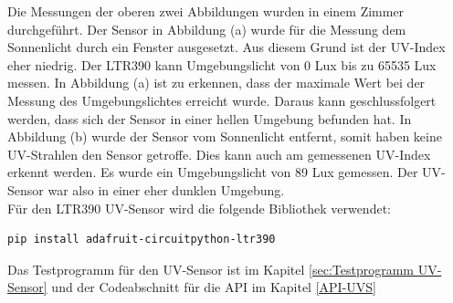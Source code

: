 Die Messungen der oberen zwei Abbildungen wurden in einem Zimmer durchgeführt. Der Sensor in Abbildung (a) wurde für die Messung dem Sonnenlicht durch ein Fenster ausgesetzt. Aus diesem Grund ist der UV-Index eher niedrig. Der LTR390 kann Umgebungslicht von 0 Lux bis zu 65535 Lux messen. In Abbildung (a) ist zu erkennen, dass der maximale Wert bei der Messung des Umgebungslichtes erreicht wurde. Daraus kann geschlussfolgert werden, dass sich der Sensor in einer hellen Umgebung befunden hat. In Abbildung (b) wurde der Sensor vom Sonnenlicht entfernt, somit haben keine UV-Strahlen den Sensor getroffe. Dies kann auch am gemessenen UV-Index erkennt werden. Es wurde ein Umgebungslicht von 89 Lux gemessen. Der UV-Sensor war also in einer eher dunklen Umgebung.\\
Für den LTR390 UV-Sensor wird die folgende Bibliothek\autocite{LTR390} verwendet:
\begin{verbatim}
pip install adafruit-circuitpython-ltr390
\end{verbatim}
\vspace{3mm}
Das Testprogramm für den UV-Sensor ist im Kapitel \ref{sec:Testprogramm UV-Sensor} und der Codeabschnitt für die API im Kapitel \ref{API-UVS}